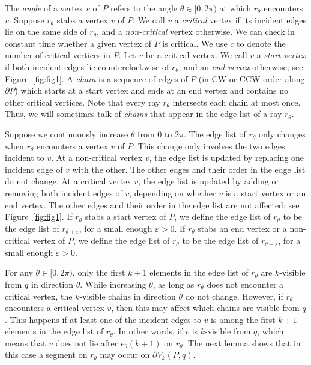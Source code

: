 \documentclass[11pt, a4paper]{article}
\newcommand{\eps}{\varepsilon}
\begin{document}
The \emph{angle} of a vertex $v$ of $P$
refers to the angle $\theta \in [0, 2\pi)$ at which 
$r_\theta$ encounters $v$. Suppose $r_\theta$ stabs a vertex $v$ of $P$.
We call $v$ a \emph{critical}
vertex if its incident edges lie on the same side of $r_\theta$, and
a \emph{non-critical} vertex otherwise. 
We can check in constant time whether a given vertex of $P$ is 
critical. We use $c$ to denote the number of 
critical vertices in $P$. Let $v$ be a critical 
vertex. We call $v$ a 
\emph{start vertex} if both incident edges lie counterclockwise
of $r_\theta$, and an \emph{end vertex} otherwise; see 
Figure~\ref{fig:fig1}.
A \emph{chain} is a sequence of edges of $P$ 
(in CW or CCW order along $\partial P$) which starts at a start vertex
and ends at an end vertex and contains no other
critical vertices. Note that every ray $r_\theta$ 
intersects each chain at most once. Thus, we will sometimes
talk of \emph{chains} that appear in the edge list of 
a ray $r_\theta$.

Suppose we continuously increase $\theta$ from $0$ to $2\pi$.
The edge list of $r_\theta$ only changes when $r_\theta$ 
encounters a vertex $v$ of $P$. This change only involves 
the two edges incident to $v$.
At a non-critical vertex $v$, the edge list is updated by
replacing one incident edge of $v$ with the other. The other edges and
their order in the edge list do not change.
At a critical vertex $v$, the edge list is updated by
adding or removing both incident edges of $v$, depending
on whether $v$ is a start vertex or an end vertex. The other edges 
and their order in the edge list are not affected; see 
Figure~\ref{fig:fig1}. 
If $r_\theta$ stabs a start vertex of $P$, we define the edge list 
of $r_\theta$ to be the edge list of $r_{\theta+\eps}$, for a 
small enough $\eps >0$. 
If $r_\theta$ stabs an end vertex or a non-critical vertex of $P$, 
we define the edge list 
of $r_\theta$ to be the edge list of $r_{\theta-\eps}$, for a 
small enough $\eps >0$.

For any $\theta \in [0, 2\pi)$,
only the first $k+1$ elements 
in the edge list of $r_\theta$ are $k$-visible from $q$ in
direction $\theta$. While increasing $\theta$, as
long as $r_\theta$ does not encounter a 
critical vertex, the $k$-visible chains in direction $\theta$ do not change.
However, if $r_\theta$ encounters a critical vertex $v$, then 
this may affect which chains are visible from $q$.
This happens if at least one of the incident edges to $v$ is among the 
first $k+1$ elements in the edge list of $r_\theta$. 
In other words, if $v$ is $k$-visible from $q$, which means that $v$ 
does not lie after $e_{\theta}(k+1)$ on $r_\theta$. 
The next lemma shows that in this case a segment on $r_\theta$ may 
occur on $\partial V_k(P,q)$. 
\end{document}
